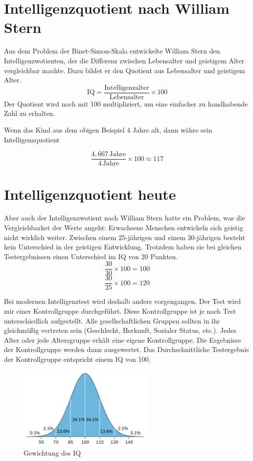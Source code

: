 \section{Intelligenzquotient nach William Stern}
Aus dem Problem der Binet-Simon-Skala entwickelte William Stern den Intelligenzwotienten, der die Differenz zwischen Lebensalter und geistigem Alter vergleichbar machte. Dazu bildet er den Quotient aus Lebensalter und geistigem Alter.
$$ \mathrm{IQ} = \frac{\mathrm{Intelligenzalter}}{\mathrm{Lebensalter}} \times 100 $$
Der Quotient wird noch mit 100 multipliziert, um eine einfacher zu handhabende Zahl zu erhalten.

Wenn das Kind aus dem obigen Beispiel 4 Jahre alt, dann währe sein Intelligenzquotient

$$ \frac{4,667\,\mathrm{Jahre}}{4\,\mathrm{Jahre}} \times 100 \approx 117 $$

\section{Intelligenzquotient heute}
Aber auch der Intelligenzwotient nach William Stern hatte ein Problem, was die Vergleichbarket der Werte angeht: Erwachsene Menschen entwickeln sich geistig nicht wirklich weiter. Zwischen einem 25-jährigen und einem 30-jährigen besteht kein Unterschied in der geistigen Entwicklung. Trotzdem haben sie bei gleichen Testergebnissen einen Unterschied im IQ von 20 Punkten.
$$ \frac{30}{30} \times 100 = 100 $$
$$ \frac{30}{25} \times 100 = 120 $$

Bei modernen Intelligenztest wird deshalb anders vorgengangen. Der Test wird mir einer Kontrollgruppe durchgeführt. Diese Kontrollgruppe ist je nach Test unterschiedlich aufgestellt. Alle gesellschaftlichen Gruppen sollten in ihr gleichmäßig vertreten sein (Geschlecht, Herkunft, Sozialer Status, etc.). Jedes Alter oder jede Altersgruppe erhält eine eigene Kontrollgruppe. Die Ergebnisse der Kontrollgruppe werden dann ausgewertet. Das Durchschnittliche Testergebnis der Kontrollgruppe entspricht einem IQ von 100.

\begin{figure}[H]
  \centering
  \includegraphics[width=0.6\textwidth]{img/IQ_distribution.png}
  \caption{Gewichtung des IQ \cite{wiki_img_iq}}
  \label{fig:iq}
\end{figure}

